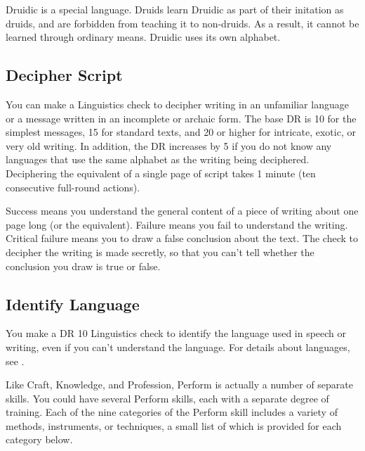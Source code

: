         Druidic is a special language.
        Druids learn Druidic as part of their initation as druids, and are forbidden from teaching it to non-druids.
        As a result, it cannot be learned through ordinary means.
        Druidic uses its own alphabet.

    \subsection{Decipher Script}
        You can make a Linguistics check to decipher writing in an unfamiliar language or a message written in an incomplete or archaic form. The base DR is 10 for the simplest messages, 15 for standard texts, and 20 or higher for intricate, exotic, or very old writing. In addition, the DR increases by 5 if you do not know any languages that use the same alphabet as the writing being deciphered. Deciphering the equivalent of a single page of script takes 1 minute (ten consecutive full-round actions).

        Success means you understand the general content of a piece of writing about one page long (or the equivalent). Failure means you fail to understand the writing. Critical failure means you to draw a false conclusion about the text. The check to decipher the writing is made secretly, so that you can't tell whether the conclusion you draw is true or false.

    \subsection{Identify Language}
        You make a DR 10 Linguistics check to identify the language used in speech or writing, even if you can't understand the language.
        For details about languages, see .

\newpage
{}
        \par Like Craft, Knowledge, and Profession, Perform is actually a number of separate skills.
        You could have several Perform skills, each with a separate degree of training.
        Each of the nine categories of the Perform skill includes a variety of methods, instruments, or techniques, a small list of which is provided for each category below.

